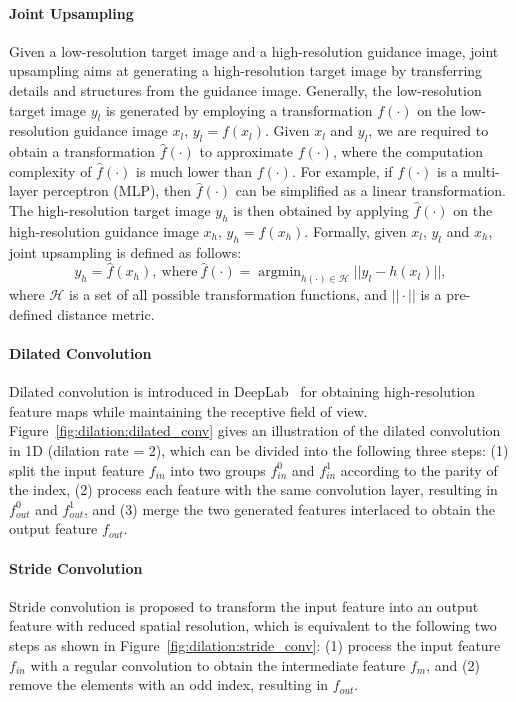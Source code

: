 \documentclass[10pt,twocolumn,letterpaper]{article}
\DeclareMathOperator*{\argmin}{argmin}
\begin{document}
\paragraph{Joint Upsampling}
Given a low-resolution target image and a high-resolution guidance image, joint upsampling aims at generating a high-resolution target image by transferring details and structures from the guidance image.
Generally, the low-resolution target image $y_l$ is generated by employing a transformation $f(\cdot)$ on the low-resolution guidance image $x_l$, \ie $y_l = f(x_l)$.
Given $x_l$ and $y_l$, we are required to obtain a transformation $\hat{f}(\cdot)$ to approximate $f(\cdot)$, where the computation complexity of $\hat{f}(\cdot)$ is much lower than $f(\cdot)$.
For example, if $f(\cdot)$ is a multi-layer perceptron (MLP), then $\hat{f}(\cdot)$ can be simplified as a linear transformation.
The high-resolution target image $y_h$ is then obtained by applying $\hat{f}(\cdot)$ on the high-resolution guidance image $x_h$, \ie $y_h = \hat{f}(x_h)$.
Formally, given $x_l$, $y_l$ and $x_h$, joint upsampling is defined as follows:
\begin{equation}
	y_h = \hat{f}(x_h),~\text{where} ~\hat{f}(\cdot) = \argmin_{h(\cdot)\in \mathcal{H}} ||y_l - h(x_l)||,
	\label{eq:ju}
\end{equation}
where $\mathcal{H}$ is a set of all possible transformation functions, and $||\cdot||$ is a pre-defined distance metric.
\vspace{-1em}
\paragraph{Dilated Convolution}
Dilated convolution is introduced in DeepLab~\cite{chen2018deeplab} for obtaining high-resolution feature maps while maintaining the receptive field of view.
Figure~\ref{fig:dilation:dilated_conv} gives an illustration of the dilated convolution in 1D (dilation rate = 2), which can be divided into the following three steps:
(1) split the input feature $f_{in}$ into two groups $f_{in}^0$ and $f_{in}^1$ according to the parity of the index,
(2) process each feature with the same convolution layer, resulting in $f_{out}^0$ and $f_{out}^1$,
and (3) merge the two generated features interlaced to obtain the output feature $f_{out}$.
\vspace{-1em}
\paragraph{Stride Convolution}
Stride convolution is proposed to transform the input feature into an output feature with reduced spatial resolution, which is equivalent to the following two steps as shown in Figure~\ref{fig:dilation:stride_conv}:
(1) process the input feature $f_{in}$ with a regular convolution to obtain the intermediate feature $f_m$,
and (2) remove the elements with an odd index, resulting in $f_{out}$.
\end{document}
